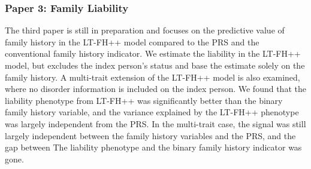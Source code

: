 \subsubsection{Paper 3: Family Liability}
The third paper is still in preparation and focuses on the predictive value of family history in the LT-FH++ model compared to the PRS and the conventional family history indicator. We estimate the liability in the LT-FH++ model, but excludes the index person's status and base the estimate solely on the family history. A multi-trait extension of the LT-FH++ model is also examined, where no disorder information is included on the index person. We found that the liability phenotype from LT-FH++ was significantly better than the binary family history variable, and the variance explained by the LT-FH++ phenotype was largely independent from the PRS. In the multi-trait case, the signal was still largely independent between the family history variables and the PRS, and the gap between The liability phenotype and the binary family history indicator was gone.
